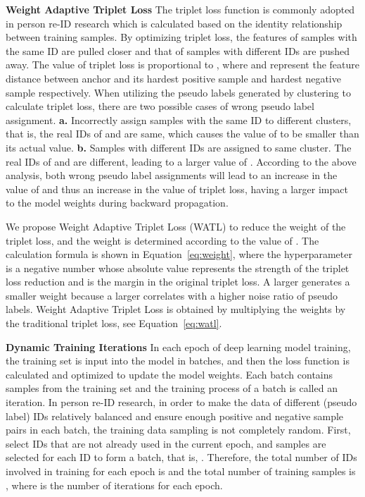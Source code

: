\documentclass[10pt,twocolumn,letterpaper]{article}
\begin{document}
   
\noindent \textbf{Weight Adaptive Triplet Loss}
The triplet loss function is commonly adopted in person re-ID research which is calculated based on the identity relationship between training samples. By optimizing triplet loss, the features of samples with the same ID are pulled closer and that of samples with different IDs are pushed away. The value of triplet loss is proportional to , where  and  represent the feature distance between anchor and its hardest positive sample and hardest negative sample respectively. When utilizing the pseudo labels generated by clustering to calculate triplet loss, there are two possible cases of wrong pseudo label assignment. \textbf{a.} Incorrectly assign samples with the same ID to different clusters, that is, the real IDs of  and  are same, which causes the value of  to be smaller than its actual value. \textbf{b.} Samples with different IDs are assigned to same cluster. The real IDs of  and  are different, leading to a larger value of . According to the above analysis, both wrong pseudo label assignments will lead to an increase in the value of  and thus an increase in the value of triplet loss, having a larger impact to the model weights during backward propagation.





We propose Weight Adaptive Triplet Loss (WATL) to reduce the weight of the triplet loss, and the weight is determined according to the value of . The calculation formula is shown in Equation~\ref{eq:weight}, where the hyperparameter  is a negative number whose absolute value represents the strength of the triplet loss reduction and  is the margin in the original triplet loss. A larger  generates a smaller weight because a larger  correlates with a higher noise ratio of pseudo labels. Weight Adaptive Triplet Loss is obtained by multiplying the weights by the traditional triplet loss, see Equation~\ref{eq:watl}.

\noindent \textbf{Dynamic Training Iterations}
In each epoch of deep learning model training, the training set is input into the model in batches, and then the loss function is calculated and optimized to update the model weights. Each batch contains  samples from the training set and the training process of a batch is called an iteration. In person re-ID research, in order to make the data of different (pseudo label) IDs relatively balanced and ensure enough positive and negative sample pairs in each batch, the training data sampling is not completely random. First, select  IDs that are not already used in the current epoch, and  samples are selected for each ID to form a batch, that is, . Therefore, the total number of IDs involved in training for each epoch is  and the total number of training samples is , where  is the number of iterations for each epoch.
\end{document}
